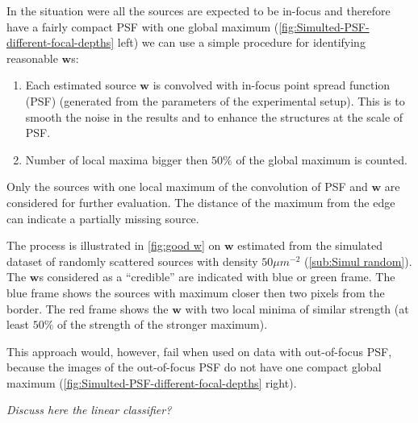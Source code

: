 In the situation were all the sources are expected to be in-focus and therefore have a fairly compact PSF with one global maximum (\autoref{fig:Simulted-PSF-different-focal-depths} left) we can use a simple procedure for identifying reasonable $\bm{w}$s:
%
\begin{enumerate}
	\item
	Each estimated source $\bm{w}$ is convolved with in-focus point spread function (PSF) (generated from the parameters of the experimental setup). This is to smooth the noise in the results and to enhance the structures at the scale of PSF. 
	\item
	Number of local maxima bigger then $50\%$ of the global maximum is counted. 
\end{enumerate}

Only the sources with one local maximum of the convolution of PSF and $\bm{w}$ are considered for further evaluation. The distance of the maximum from the edge can indicate a partially missing source. 

The process is illustrated in \autoref{fig:good w} on $\bm{w}$ estimated from the simulated dataset of randomly scattered sources with density $50\unit{\mu m^{-2}}$ (\autoref{sub:Simul random}). The $\bm{w}$s considered as a ``credible'' are indicated with blue or green frame. The blue frame shows the sources with maximum closer then two pixels from the border. The red frame shows the $\bm{w}$ with two local minima of similar strength (at least $50\%$ of the strength of the stronger maximum).

This approach would, however, fail when used on data with out-of-focus PSF, because the images of the out-of-focus PSF do not have one compact global maximum (\autoref{fig:Simulted-PSF-different-focal-depths} right).

\emph{Discuss here the linear classifier?} \fix

